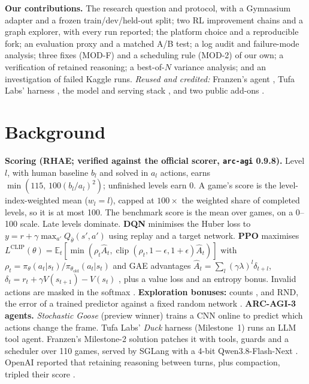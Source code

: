 \documentclass[10pt]{article}
\begin{document}
\textbf{Our contributions.} The research question and protocol, with a Gymnasium adapter and a frozen train/dev/held-out split; two RL improvement chains and a graph explorer, with every run reported; the platform choice and a reproducible fork; an evaluation proxy and a matched A/B test; a log audit and failure-mode analysis; three fixes (MOD-F) and a scheduling rule (MOD-2) of our own; a verification of retained reasoning; a best-of-$N$ variance analysis; and an investigation of failed Kaggle runs. \emph{Reused and credited:} Franzen's agent \citep{franzen2026m2}, Tufa Labs' harness \citep{tufa2026duck}, the model and serving stack \citep{qwen2026flash,zheng2024sglang}, and two public add-ons \citep{heliosli2026,shiiin2026}.

\section{Background}
\textbf{Scoring (RHAE; verified against the official scorer, \texttt{arc-agi} 0.9.8).} Level $l$, with human baseline $b_l$ and solved in $a_l$ actions, earns $\min(115,\,100(b_l/a_l)^2)$; unfinished levels earn 0. A game's score is the level-index-weighted mean ($w_l=l$), capped at $100\times$ the weighted share of completed levels, so it is at most 100. The benchmark score is the mean over games, on a 0--100 scale. Late levels dominate.
\textbf{DQN} \citep{mnih2015} minimises the Huber loss to $y=r+\gamma\max_{a'}Q_{\bar\theta}(s',a')$ using replay and a target network. \textbf{PPO} \citep{schulman2017} maximises $L^{\text{CLIP}}(\theta)=\mathbb{E}_t[\min(\rho_t\hat A_t,\operatorname{clip}(\rho_t,1{-}\epsilon,1{+}\epsilon)\hat A_t)]$ with $\rho_t=\pi_\theta(a_t|s_t)/\pi_{\theta_{\text{old}}}(a_t|s_t)$ and GAE advantages $\hat A_t=\sum_{l}(\gamma\lambda)^l\delta_{t+l}$, $\delta_t=r_t+\gamma V(s_{t+1})-V(s_t)$ \citep{schulman2016gae}, plus a value loss and an entropy bonus. Invalid actions are masked in the softmax \citep{huang2022mask}. \textbf{Exploration bonuses:} counts \citep{bellemare2016}, and RND, the error of a trained predictor against a fixed random network \citep{burda2019}.
\textbf{ARC-AGI-3 agents.} \emph{Stochastic Goose} \citep{smit2025goose} (preview winner) trains a CNN online to predict which actions change the frame. Tufa Labs' \emph{Duck} harness \citep{tufa2026duck} (Milestone~1) runs an LLM tool agent. Franzen's Milestone-2 solution \citep{franzen2026m2} patches it with tools, guards and a scheduler over 110 games, served by SGLang \citep{zheng2024sglang} with a 4-bit Qwen3.8-Flash-Next \citep{qwen2026flash}. OpenAI reported that retaining reasoning between turns, plus compaction, tripled their score \citep{openai2026retained}.
\end{document}

